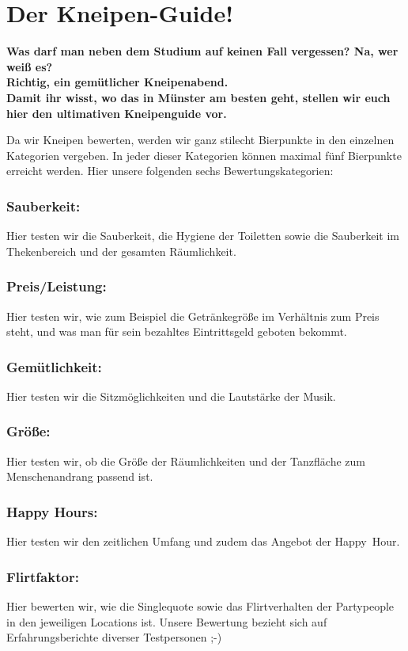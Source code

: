 \section{Der Kneipen-Guide!}
\begin{multicols*}{2}
\textbf{Was darf man neben dem Studium auf keinen Fall vergessen? Na, wer weiß es?\\
Richtig, ein gemütlicher Kneipenabend.\\
Damit ihr wisst, wo das in Münster am besten geht, stellen wir euch hier den ultimativen Kneipenguide vor.}

Da wir Kneipen bewerten, werden wir ganz stilecht Bierpunkte in den einzelnen Kategorien vergeben. In jeder dieser Kategorien können maximal fünf Bierpunkte erreicht werden. Hier unsere folgenden sechs Bewertungskategorien:

\subsubsection*{Sauberkeit:}
Hier testen wir die Sauberkeit, die Hygiene der Toiletten sowie die Sauberkeit im Thekenbereich und der gesamten Räumlichkeit.

\subsubsection*{Preis/Leistung:}
Hier testen wir, wie zum Beispiel die Getränkegröße im Verhältnis zum Preis steht, und was man für sein bezahltes Eintrittsgeld geboten bekommt.

\subsubsection*{Gemütlichkeit:}
Hier testen wir die Sitzmöglichkeiten und die Lautstärke der Musik.

\subsubsection*{Größe:}
Hier testen wir, ob die Größe der Räumlichkeiten und der Tanzfläche zum Menschenandrang passend ist.

\subsubsection*{Happy Hours:}
Hier testen wir den zeitlichen Umfang und zudem das Angebot der Happy~Hour.

\subsubsection*{Flirtfaktor:}
Hier bewerten wir, wie die Singlequote sowie das Flirtverhalten der Partypeople in den jeweiligen Locations ist. Unsere Bewertung bezieht sich auf Erfahrungsberichte diverser Testpersonen ;-)


\end{multicols*}
